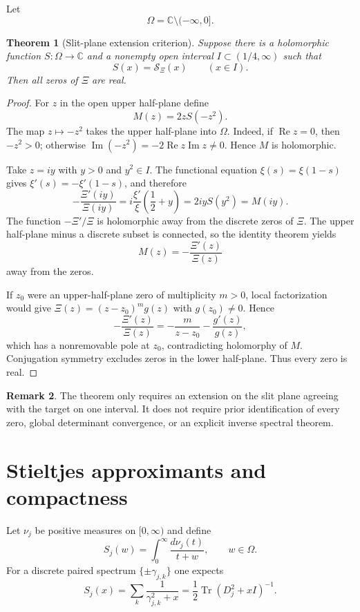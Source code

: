 \documentclass[11pt]{article}
\newtheorem{theorem}{Theorem}[section]
\theoremstyle{definition}
\newtheorem{remark}[theorem]{Remark}
\newcommand{\C}{\mathbb C}
\newcommand{\XiR}{\mathcal S_{\Xi}}
\newcommand{\Tr}{\operatorname{Tr}}
\begin{document}
Let
\[
\Omega=\C\setminus(-\infty,0].
\]

\begin{theorem}[Slit-plane extension criterion]\label{thm:slit}
Suppose there is a holomorphic function $S:\Omega\to\C$ and a nonempty open
interval $I\subset(1/4,\infty)$ such that
\[
S(x)=\XiR(x)\qquad(x\in I).
\]
Then all zeros of $\Xi$ are real.
\end{theorem}

\begin{proof}
For $z$ in the open upper half-plane define
\[
M(z)=2zS(-z^2).
\]
The map $z\mapsto-z^2$ takes the upper half-plane into $\Omega$.  Indeed, if
$\operatorname{Re}z=0$, then $-z^2>0$; otherwise
$\operatorname{Im}(-z^2)=-2\operatorname{Re}z\operatorname{Im}z\neq0$.
Hence $M$ is holomorphic.

Take $z=iy$ with $y>0$ and $y^2\in I$.  The functional equation
$\xi(s)=\xi(1-s)$ gives $\xi'(s)=-\xi'(1-s)$, and therefore
\[
-\frac{\Xi'(iy)}{\Xi(iy)}
=i\frac{\xi'}{\xi}\!\left(\frac12+y\right)
=2iyS(y^2)=M(iy).
\]
The function $-\Xi'/\Xi$ is holomorphic away from the discrete zeros of $\Xi$.
The upper half-plane minus a discrete subset is connected, so the identity
theorem yields
\[
M(z)=-\frac{\Xi'(z)}{\Xi(z)}
\]
away from the zeros.

If $z_0$ were an upper-half-plane zero of multiplicity $m>0$, local
factorization would give $\Xi(z)=(z-z_0)^m g(z)$ with $g(z_0)\neq0$.  Hence
\[
-\frac{\Xi'(z)}{\Xi(z)}=-\frac{m}{z-z_0}-\frac{g'(z)}{g(z)},
\]
which has a nonremovable pole at $z_0$, contradicting holomorphy of $M$.
Conjugation symmetry excludes zeros in the lower half-plane.  Thus every zero
is real.
\end{proof}

\begin{remark}
The theorem only requires an extension on the slit plane agreeing with the
target on one interval.  It does not require prior identification of every
zero, global determinant convergence, or an explicit inverse spectral theorem.
\end{remark}

\section{Stieltjes approximants and compactness}

Let $\nu_j$ be positive measures on $[0,\infty)$ and define
\[
S_j(w)=\int_0^\infty\frac{d\nu_j(t)}{t+w},\qquad w\in\Omega.
\]
For a discrete paired spectrum $\{\pm\gamma_{j,k}\}$ one expects
\[
S_j(x)=\sum_k\frac1{\gamma_{j,k}^2+x}
=\frac12\Tr(D_j^2+xI)^{-1}.
\]
\end{document}
